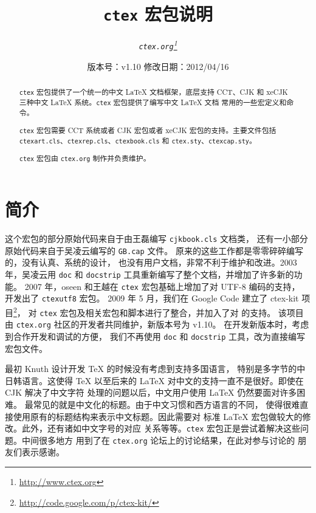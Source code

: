 \documentclass{ltxdoc}
\newcommand{\ctex}{\texttt{ctex}}
\newcommand{\ctexorg}{\texttt{ctex.org}}
\begin{document}
\title{\bf \ctex{} 宏包说明}
\author{\it \ctexorg\thanks{\url{http://www.ctex.org}}}
\date{\small 版本号：v1.10 \ccwd 修改日期：2012/04/16}
\maketitle


\begin{abstract}
\ctex{} 宏包提供了一个统一的中文 \LaTeX{} 文档框架，底层支持 CCT、CJK 和
 xeCJK 三种中文 \LaTeX{} 系统。\ctex{} 宏包提供了编写中文 \LaTeX{} 文档
常用的一些宏定义和命令。

\ctex{} 宏包需要 CCT 系统或者 CJK 宏包或者 xeCJK 宏包的支持。主要文件包括
 \texttt{ctexart.cls}、\texttt{ctexrep.cls}、\texttt{ctexbook.cls} 和
 \texttt{ctex.sty}、\texttt{ctexcap.sty}。

\ctex{} 宏包由 \ctexorg{} 制作并负责维护。
\end{abstract}

\tableofcontents

\section{简介}

这个宏包的部分原始代码来自于由王磊编写 \texttt{cjkbook.cls} 文档类，
还有一小部分原始代码来自于吴凌云编写的 \texttt{GB.cap} 文件。
原来的这些工作都是零零碎碎编写的，没有认真、系统的设计，
也没有用户文档，非常不利于维护和改进。2003 年，吴凌云用 \texttt{doc}
和 \texttt{docstrip} 工具重新编写了整个文档，并增加了许多新的功能。
2007 年，oseen 和王越在 \ctex{} 宏包基础上增加了对 UTF-8 编码的支持，
开发出了 \texttt{ctexutf8} 宏包。
2009 年 5 月，我们在 Google Code 建立了 ctex-kit 项目\footnote{\url{http://code.google.com/p/ctex-kit/}}，
对 \ctex{} 宏包及相关宏包和脚本进行了整合，并加入了对 \XeTeX{} 的支持。
该项目由 \ctexorg{} 社区的开发者共同维护，新版本号为 v1.10。
在开发新版本时，考虑到合作开发和调试的方便，
我们不再使用 \texttt{doc} 和 \texttt{docstrip} 工具，改为直接编写宏包文件。

最初 Knuth 设计开发 \TeX{} 的时候没有考虑到支持多国语言，
特别是多字节的中日韩语言。这使得 \TeX{} 以至后来的
\LaTeX{} 对中文的支持一直不是很好。即使在 CJK 解决了中文字符
处理的问题以后，中文用户使用 \LaTeX{} 仍然要面对许多困难。
最常见的就是中文化的标题。由于中文习惯和西方语言的不同，
使得很难直接使用原有的标题结构来表示中文标题。因此需要对
标准 \LaTeX{} 宏包做较大的修改。此外，还有诸如中文字号的对应
关系等等。\ctex{} 宏包正是尝试着解决这些问题。中间很多地方
用到了在 \ctexorg{} 论坛上的讨论结果，在此对参与讨论的
朋友们表示感谢。
\end{document}

